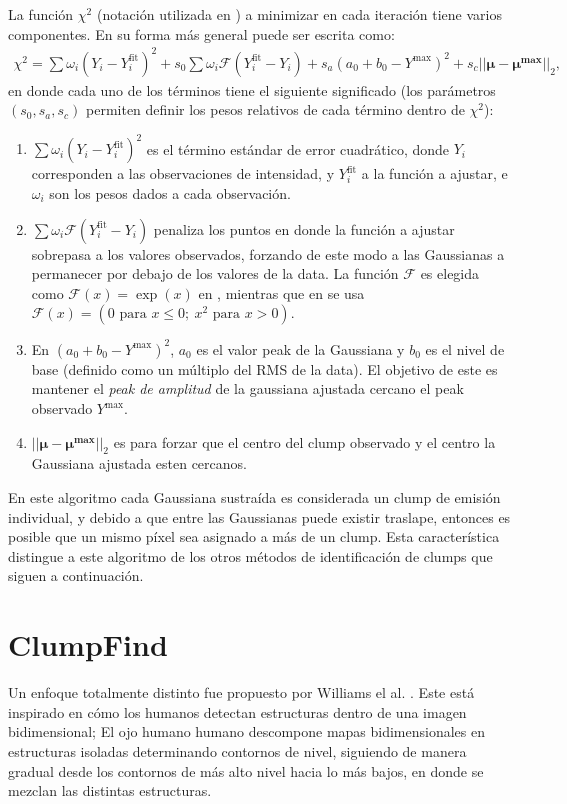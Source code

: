 La función $\chi^2$ (notación utilizada en \cite{Stutzki}) a minimizar en cada iteración tiene varios componentes. En su forma más general puede ser escrita como:
\begin{align}
    \chi^2 = \sum \omega_i (Y_i - Y_i^{\text{fit}})^2 + s_0 \sum \omega_i \mathcal{F}(Y_i^{\text{fit}}- Y_i) + s_a (a_0 + b_0 - Y^{\text{max}})^2 + s_c ||\boldsymbol{\mu - \mu^{\text{max}}}||_2,
\end{align}
en donde cada uno de los términos tiene el siguiente significado (los parámetros $(s_0, s_a, s_c)$ permiten definir los pesos relativos de cada término dentro de $\chi^2$):
\begin{enumerate}
    \item $\displaystyle \sum \omega_i (Y_i - Y_i^{\text{fit}})^2$ es el término estándar de error cuadrático, donde $Y_i$ corresponden a las observaciones de intensidad, y $Y_i^{\text{fit}}$ a la función a ajustar, e $\omega_i$ son los pesos dados a cada observación.
    \item $\displaystyle \sum \omega_i \mathcal{F}(Y_i^{\text{fit}}-Y_i)$ penaliza los puntos en donde la función a ajustar sobrepasa a los valores observados, forzando de este modo a las Gaussianas a permanecer por debajo de los valores de la data. La función $\mathcal{F}$ es elegida como $\mathcal{F}(x)=\exp(x)$ en \cite{Stutzki}, mientras que en \cite{Kramer} se usa $\mathcal{F}(x) = (0 \text{ para } x\leq 0; \ x^2 \text{ para } x>0)$.
    \item En $(a_0 + b_0 - Y^{\text{max}})^2$, $a_0$ es el valor peak de la Gaussiana y $b_0$ es el nivel de base (definido como un múltiplo del RMS de la data). El objetivo de este es mantener el \textit{peak de amplitud} de la gaussiana ajustada cercano el peak observado $Y^{\text{max}}$.
    \item $||\boldsymbol{\mu - \mu^{\text{max}}}||_2$ es para forzar que el centro del clump observado y el centro la Gaussiana ajustada esten cercanos.
\end{enumerate}

En este algoritmo cada Gaussiana sustraída es considerada un clump de emisión individual, y debido a que entre las Gaussianas puede existir traslape, entonces es posible que un mismo píxel sea asignado a más de un clump. Esta característica distingue a este algoritmo de los otros métodos de identificación de clumps que siguen a continuación.



\section{ClumpFind}
Un enfoque totalmente distinto fue propuesto por Williams el al. \cite{Williams}. Este está inspirado en cómo los humanos detectan estructuras dentro de una imagen bidimensional; El ojo humano humano descompone mapas bidimensionales en estructuras isoladas determinando contornos de nivel, siguiendo de manera gradual desde los contornos de más alto nivel hacia lo más bajos, en donde se mezclan las distintas estructuras.

